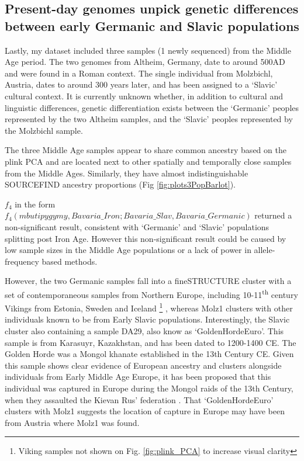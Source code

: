 \subsection{Present-day genomes unpick genetic differences between early Germanic and Slavic populations}

Lastly, my dataset included three samples (1 newly sequenced) from the Middle Age period. The two genomes from Altheim, Germany, date to around 500AD and were found in a Roman context. The single individual from Molzbichl, Austria, dates to around 300 years later, and has been assigned to a `Slavic' cultural context. It is currently unknown whether, in addition to cultural and linguistic differences, genetic differentiation exists between the `Germanic’ peoples represented by the two Altheim samples, and the `Slavic’ peoples represented by the Molzbichl sample.

The three Middle Age samples appear to share common ancestry based on the plink PCA and are located next to other spatially and temporally close samples from the Middle Ages. Similarly, they have almost indistinguishable SOURCEFIND ancestry proportions (Fig \ref{fig:plots3PopBarlot}).

$f_{4}$ in the form $f_{4}(mbutipygymy, Bavaria\_Iron; Bavaria\_Slav, Bavaria\_Germanic)$ returned a non-significant result, consistent with `Germanic' and `Slavic' populations splitting post Iron Age. However this non-significant result could be caused by low sample sizes in the Middle Age populations or a lack of power in allele-frequency based methods.

However, the two Germanic samples fall into a fineSTRUCTURE cluster with a set of contemporaneous samples from Northern Europe, including 10-11\textsuperscript{th} century Vikings from Estonia, Sweden and Iceland \footnote{Viking samples not shown on Fig. \ref{fig:plink_PCA} to increase visual clarity} , whereas Molz1 clusters with other individuals known to be from Early Slavic populations. Interestingly, the Slavic cluster also containing a sample DA29, also know as `GoldenHordeEuro'. This sample is from Karasuyr, Kazakhstan, and has been dated to 1200-1400 CE. The Golden Horde was a Mongol khanate established in the 13th Century CE. Given this sample shows clear evidence of European ancestry and clusters alongside individuals from Early Middle Age Europe, it has been proposed that this individual was captured in Europe during the Mongol raids of the 13th Century, when they assaulted the Kievan Rus' federation \cite{de2018137}. That `GoldenHordeEuro' clusters with Molz1 suggests the location of capture in Europe may have been from Austria where Molz1 was found.

